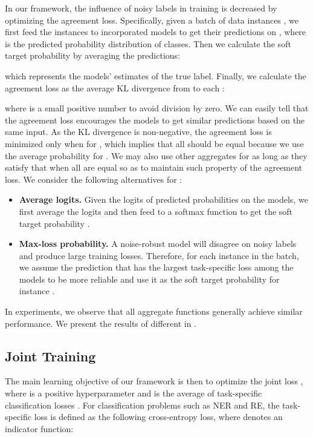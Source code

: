 \documentclass[11pt]{article}
\begin{document}
In our framework, the influence of noisy labels in training is decreased by optimizing the agreement loss.
Specifically, given a batch of data instances , we first feed the instances to  incorporated models to get their predictions  on , where  is the predicted probability distribution of  classes.
Then we calculate the soft target probability  by averaging the predictions:

which represents the models' estimates of the true label.
Finally, we calculate the agreement loss  as the average KL divergence from  to each :

where  is a small positive number to avoid division by zero.
We can easily tell that the agreement loss encourages the models to get similar predictions based on the same input.
As the KL divergence is non-negative, the agreement loss is minimized only when  for , which implies that all  should be equal because we use the average probability for .
We may also use other aggregates for  as long as they satisfy that  when all  are equal so as to maintain such property of the agreement loss.
We consider the following alternatives for :
\begin{itemize}[leftmargin=1em]
    \setlength\itemsep{0em}
    \item \textbf{Average logits.} Given the logits  of predicted probabilities on the  models, we first average the logits  and then feed  to a softmax function to get the soft target probability .

    \item \textbf{Max-loss probability.} A noise-robust model will disagree on noisy labels and produce large training losses.
    Therefore, for each instance  in the batch, we assume the prediction  that has the largest task-specific loss among the  models to be more reliable and use it as the soft target probability for instance .
\end{itemize}
In experiments, we observe that all aggregate functions generally achieve similar performance.
We present the results of different  in .

\subsection{Joint Training}
The main learning objective of our framework is then to optimize the joint loss , where  is a positive hyperparameter and  is the average of task-specific classification losses . 
For classification problems such as NER and RE, the task-specific loss is defined as the following cross-entropy loss, where  denotes an indicator function:
\end{document}
